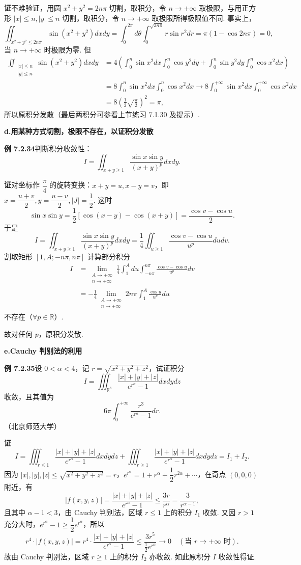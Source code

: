 \documentclass[UTF8,12pt,a4paper,fontset=fandol]{ctexart}
\begin{document}
\noindent\textbf{证}\quad 不难验证，用圆 $x^2+y^2=2n\pi$ 切割，取积分，令 $n\to+\infty$ 取极限，与用正方形 $|x|\le n,|y|\le n$ 切割，取积分，令 $n\to+\infty$ 取极限所得极限值不同. 事实上，
\[
\iint_{x^2+y^2\le2n\pi}\sin(x^2+y^2)dxdy
=\int_0^{2\pi}d\theta\int_0^{\sqrt{2n\pi}}r\sin r^2dr
=\pi(1-\cos2n\pi)=0,
\]
当 $n\to+\infty$ 时极限为零. 但
\[
\begin{aligned}
\iint_{\substack{|x|\le n\\|y|\le n}}\sin(x^2+y^2)dxdy
&=4\left(\int_0^n\sin x^2dx\int_0^n\cos y^2dy
+\int_0^n\sin y^2dy\int_0^n\cos x^2dx\right)\\
&=8\int_0^n\sin x^2dx\int_0^n\cos x^2dx
\to8\int_0^{+\infty}\sin x^2dx\int_0^{+\infty}\cos x^2dx\\
&=8\left(\frac12\sqrt{\frac\pi2}\right)^2=\pi,
\end{aligned}
\]
所以原积分发散（最后两积分可参看上节练习 7.1.30 及提示）.

\noindent\textbf{d.\quad 用某种方式切割，极限不存在，以证积分发散}

\noindent\textbf{例 7.2.34}\quad 判断积分收敛性：
\[
I=\iint_{x+y\ge1}\frac{\sin x\sin y}{(x+y)^p}dxdy.
\]

\noindent\textbf{证}\quad 对坐标作 $\dfrac\pi4$ 的旋转变换：$x+y=u,x-y=v$，即 $x=\dfrac{u+v}2,y=\dfrac{u-v}2,|J|=\dfrac12$. 这时
\[
\sin x\sin y=\frac12[\cos(x-y)-\cos(x+y)]
=\frac{\cos v-\cos u}2.
\]
于是
\[
I=\iint_{x+y\ge1}\frac{\sin x\sin y}{(x+y)^p}dxdy
=\frac14\iint_{u\ge1}\frac{\cos v-\cos u}{u^p}dudv.
\]
割取矩形 $[1,A;-n\pi,n\pi]$ 计算部分积分
\[
\begin{aligned}
I&=\lim_{\substack{A\to+\infty\\ n\to+\infty}}
\frac14\int_1^Adu\int_{-n\pi}^{n\pi}\frac{\cos v-\cos u}{u^p}dv\\
&=-\frac14\lim_{\substack{A\to+\infty\\ n\to+\infty}}
2n\pi\int_1^A\frac{\cos u}{u^p}du
\end{aligned}
\]
不存在（$\forall p\in\mathbb R$）.

故对任何 $p$，原积分发散.

\noindent\textbf{e.\quad Cauchy 判别法的利用}

\noindent\textbf{例 7.2.35}\quad 设 $0<\alpha<4$，记 $r=\sqrt{x^2+y^2+z^2}$，试证积分
\[
I=\iiint_{\mathbb R^3}\frac{|x|+|y|+|z|}{e^{r^\alpha}-1}dxdydz
\]
收敛，且其值为
\[
6\pi\int_0^{+\infty}\frac{r^3}{e^{r^\alpha}-1}dr.
\]
（北京师范大学）

\noindent\textbf{证}\quad
\[
I=\iiint_{r\le1}\frac{|x|+|y|+|z|}{e^{r^\alpha}-1}dxdydz
+\iiint_{r\ge1}\frac{|x|+|y|+|z|}{e^{r^\alpha}-1}dxdydz
=I_1+I_2.
\]
因为 $|x|,|y|,|z|\le\sqrt{x^2+y^2+z^2}=r$，$e^{r^\alpha}=1+r^\alpha+\dfrac12r^{2\alpha}+\cdots$，在奇点 $(0,0,0)$ 附近，有
\[
|f(x,y,z)|=\frac{|x|+|y|+|z|}{e^{r^\alpha}-1}
\le\frac{3r}{r^\alpha}=\frac3{r^{\alpha-1}},
\]
且其中 $\alpha-1<3$，由 Cauchy 判别法，区域 $r\le1$ 上的积分 $I_1$ 收敛. 又因 $r>1$ 充分大时，$e^{r^\alpha}-1\ge\dfrac12e^{r^\alpha}$，所以
\[
r^4\cdot |f(x,y,z)|
=r^4\cdot\frac{|x|+|y|+|z|}{e^{r^\alpha}-1}
\le\frac{3r^5}{\frac12e^{r^\alpha}}\to0\quad(\text{当 }r\to+\infty\text{ 时}).
\]
故由 Cauchy 判别法，区域 $r\ge1$ 上的积分 $I_2$ 亦收敛. 如此原积分 $I$ 收敛性得证.
\end{document}
